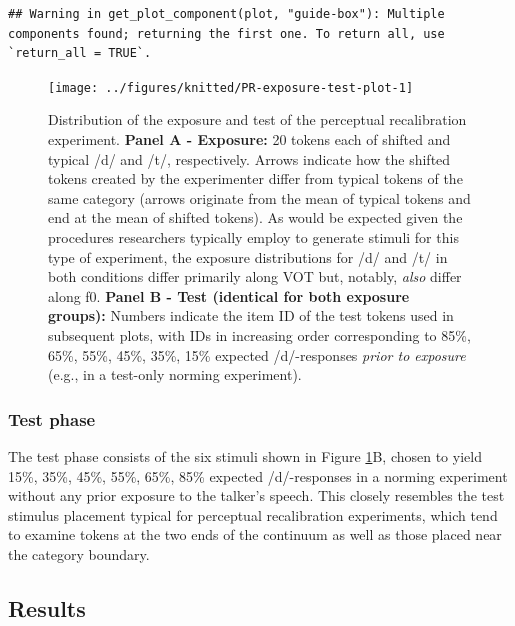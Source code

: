 \documentclass[
  11pt,
  man,floatsintext]{apa6}
\begin{document}
\color{orange}

\begin{verbatim}## Warning in get_plot_component(plot, "guide-box"): Multiple components found; returning the first one. To return all, use `return_all = TRUE`.
\end{verbatim}

\color{black}

\begin{figure}

{\centering \texttt{[image: ../figures/knitted/PR-exposure-test-plot-1]} 

}

\caption{Distribution of the exposure and test of the perceptual recalibration experiment. \textbf{Panel A - Exposure:} 20 tokens each of shifted and typical /d/ and /t/, respectively. Arrows indicate how the shifted tokens created by the experimenter differ from typical tokens of the same category (arrows originate from the mean of typical tokens and end at the mean of shifted tokens). As would be expected given the procedures researchers typically employ to generate stimuli for this type of experiment, the exposure distributions for /d/ and /t/ in both conditions differ primarily along VOT but, notably, \emph{also} differ along f0. \textbf{Panel B - Test (identical for both exposure groups):} Numbers indicate the item ID of the test tokens used in subsequent plots, with IDs in increasing order corresponding to 85\%, 65\%, 55\%, 45\%, 35\%, 15\% expected /d/-responses \emph{prior to exposure} (e.g., in a test-only norming experiment).}\label{fig:PR-exposure-test-plot}
\end{figure}

\subsubsection{Test phase}\label{test-phase}

The test phase consists of the six stimuli shown in Figure \ref{fig:PR-exposure-test-plot}B, chosen to yield 15\%, 35\%, 45\%, 55\%, 65\%, 85\% expected /d/-responses in a norming experiment without any prior exposure to the talker's speech. This closely resembles the test stimulus placement typical for perceptual recalibration experiments, which tend to examine tokens at the two ends of the continuum as well as those placed near the category boundary.

\subsection{Results}\label{results}
\end{document}
